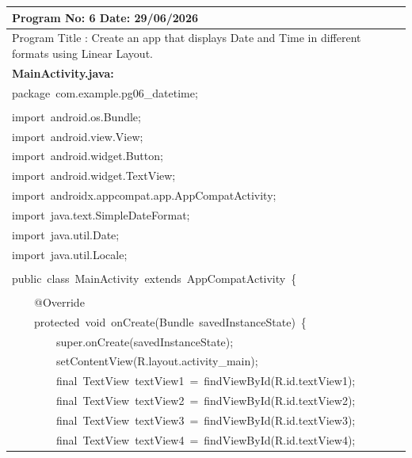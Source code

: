 \documentclass[a4paper,12pt]{article}
\begin{document}
\noindent\begingroup
\renewcommand{\arraystretch}{1.1}
\begin{longtable}{|p{}|}
\hline\endfirsthead\hline\endhead\hline\endfoot\hline\endlastfoot
\rule{0pt}{13pt}Program No: 6 \hfill Date: 29/06/2026 \\
\hline
\rule{0pt}{13pt}Program Title : Create an app that displays Date and Time in different formats using Linear Layout. \\
\hline
\rule{0pt}{13pt}\textbf{MainActivity.java:} \\
\hline
{\ttfamily\small package\ com.example.pg06\_datetime;} \\
\strut \\
{\ttfamily\small import\ android.os.Bundle;} \\
{\ttfamily\small import\ android.view.View;} \\
{\ttfamily\small import\ android.widget.Button;} \\
{\ttfamily\small import\ android.widget.TextView;} \\
{\ttfamily\small import\ androidx.appcompat.app.AppCompatActivity;} \\
{\ttfamily\small import\ java.text.SimpleDateFormat;} \\
{\ttfamily\small import\ java.util.Date;} \\
{\ttfamily\small import\ java.util.Locale;} \\
\strut \\
{\ttfamily\small public\ class\ MainActivity\ extends\ AppCompatActivity\ \{} \\
\strut \\
{\ttfamily\small \ \ \ \ @Override} \\
{\ttfamily\small \ \ \ \ protected\ void\ onCreate(Bundle\ savedInstanceState)\ \{} \\
{\ttfamily\small \ \ \ \ \ \ \ \ super.onCreate(savedInstanceState);} \\
{\ttfamily\small \ \ \ \ \ \ \ \ setContentView(R.layout.activity\_main);} \\
{\ttfamily\small \ \ \ \ \ \ \ \ final\ TextView\ textView1\ =\ findViewById(R.id.textView1);} \\
{\ttfamily\small \ \ \ \ \ \ \ \ final\ TextView\ textView2\ =\ findViewById(R.id.textView2);} \\
{\ttfamily\small \ \ \ \ \ \ \ \ final\ TextView\ textView3\ =\ findViewById(R.id.textView3);} \\
{\ttfamily\small \ \ \ \ \ \ \ \ final\ TextView\ textView4\ =\ findViewById(R.id.textView4);} \\

\end{longtable}
\end{document}
